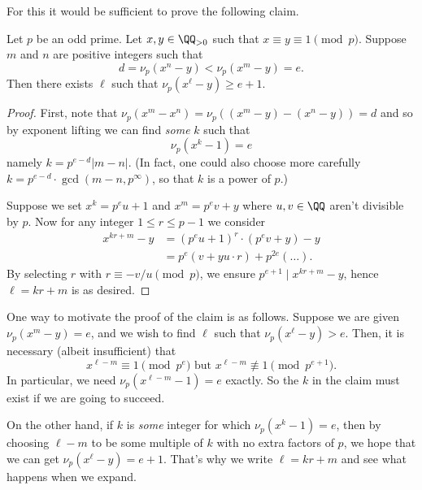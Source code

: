 \documentclass[11pt]{scrartcl}
\begin{document}
For this it would be sufficient to prove the following claim.
\begin{claim*}
  Let $p$ be an odd prime.
  Let $x, y \in \QQ_{>0}$ such that $x \equiv y \equiv 1 \pmod p$.
  Suppose $m$ and $n$ are positive integers such that
  \[ d = \nu_p(x^n-y) < \nu_p(x^m-y) = e. \]
  Then there exists $\ell$ such that $\nu_p(x^\ell - y) \ge e + 1$.
\end{claim*}
\begin{proof}
First, note that
$\nu_p(x^m - x^n) = \nu_p\left( (x^m-y) - (x^n-y) \right) = d$
and so by exponent lifting we can find \emph{some} $k$ such that
\[ \nu_p(x^k-1) = e \]
namely $k = p^{e-d}|m-n|$.
(In fact, one could also choose more carefully
$k = p^{e-d} \cdot \gcd(m-n, p^\infty)$,
so that $k$ is a power of $p$.)

Suppose we set $x^k = p^e u + 1$ and $x^m = p^e v + y$
where $u,v \in \QQ$ aren't divisible by $p$.
Now for any integer $1 \le r \le p-1$ we consider
\begin{align*}
  x^{kr+m}-y &= (p^e u + 1)^r \cdot (p^e v + y) - y \\
  &= p^e \left( v + yu \cdot r \right) + p^{2e} \left( \dots \right).
\end{align*}
By selecting $r$ with $r \equiv -v/u \pmod p$,
we ensure $p^{e+1} \mid x^{kr+m} - y$,
hence $\ell = kr+m$ is as desired.
\end{proof}

\begin{remark*}
  One way to motivate the proof of the claim is as follows.
  Suppose we are given $\nu_p(x^m-y) = e$,
  and we wish to find $\ell$ such that $\nu_p(x^\ell - y) > e$.
  Then, it is necessary (albeit insufficient) that
  \[ x^{\ell-m} \equiv 1 \pmod{p^e} \text{ but }
    x^{\ell-m} \not\equiv 1 \pmod{p^{e+1}}. \]
  In particular, we need $\nu_p(x^{\ell-m}-1) = e$ exactly.
  So the $k$ in the claim must exist if we are going to succeed.

  On the other hand, if $k$ is \emph{some} integer for which
  $\nu_p(x^k-1) = e$, then by choosing $\ell-m$ to be some
  multiple of $k$ with no extra factors of $p$,
  we hope that we can get $\nu_p(x^\ell-y) = e+1$.
  That's why we write $\ell = kr+m$ and see what happens when we expand.
\end{remark*}
\pagebreak
\end{document}
